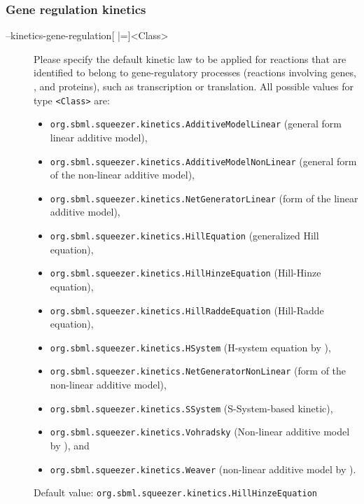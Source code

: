 \subsubsection{Gene regulation kinetics}
\begin{description}
\item[--kinetics-gene-regulation{[} |={]}<Class>]
  Please specify the default kinetic law to be applied for reactions
  that are identified to belong to gene-regulatory processes (reactions
  involving genes, \RNA, and proteins), such as transcription or
  translation.
  All possible values for type \texttt{<Class>} are:
  \begin{itemize}
  \item\texttt{org.sbml.squeezer.kinetics.AdditiveModelLinear} (general form linear additive model),
  \item\texttt{org.sbml.squeezer.kinetics.AdditiveModelNonLinear} (general form of the non-linear additive model),
  \item\texttt{org.sbml.squeezer.kinetics.NetGeneratorLinear} (\NetGenerator form of the linear additive model),
  \item\texttt{org.sbml.squeezer.kinetics.HillEquation} (generalized Hill equation),
  \item\texttt{org.sbml.squeezer.kinetics.HillHinzeEquation} (Hill-Hinze equation), 
  \item\texttt{org.sbml.squeezer.kinetics.HillRaddeEquation} (Hill-Radde equation),
  \item\texttt{org.sbml.squeezer.kinetics.HSystem} (H-system equation by \citealp{Spieth2006}),
  \item\texttt{org.sbml.squeezer.kinetics.NetGeneratorNonLinear} (\NetGenerator form of the non-linear additive model),
  \item\texttt{org.sbml.squeezer.kinetics.SSystem} (S-System-based kinetic),
  \item\texttt{org.sbml.squeezer.kinetics.Vohradsky} (Non-linear additive model by \citealp*{Vu2007}), and
  \item\texttt{org.sbml.squeezer.kinetics.Weaver} (non-linear additive model by \citealp{Weaver1999}).
  \end{itemize}
  Default value: \texttt{org.sbml.squeezer.kinetics.HillHinzeEquation}


\end{description}
